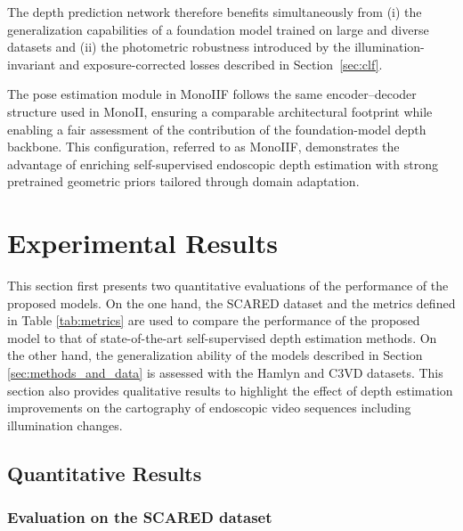 \documentclass[a4paper,fleqn]{cas-dc}
\begin{document}
{%

The depth prediction network therefore benefits simultaneously from (i) the generalization capabilities of a foundation model trained on large and diverse datasets and (ii) the photometric robustness introduced by the illumination-invariant and exposure-corrected losses described in Section~\ref{sec:clf}.
%

The pose estimation module in MonoIIF follows the same encoder–decoder structure used in MonoII, ensuring a comparable architectural footprint while enabling a fair assessment of the contribution of the foundation-model depth backbone. This configuration, referred to as MonoIIF, demonstrates the advantage of enriching self-supervised endoscopic depth estimation with strong pretrained geometric priors tailored through domain adaptation. 

%
\section{Experimental Results \label{sec:Experimental-Results}}
%
This section first presents two quantitative evaluations of the performance of the proposed models. On the one hand, the SCARED dataset and the metrics defined in Table \ref{tab:metrics} are used to compare the performance of the proposed model to that of state-of-the-art self-supervised depth estimation methods. On the other hand, the generalization ability  of the models described in Section \ref{sec:methods_and_data} is assessed with the Hamlyn and C3VD datasets. This section also provides qualitative results to highlight the effect of depth estimation improvements on the cartography of endoscopic video sequences including illumination changes.

\subsection{Quantitative Results \label{sec:quantitative}}
%
\subsubsection{Evaluation on the SCARED dataset\label{sec:Scared_comparison}}
%

}
\end{document}
